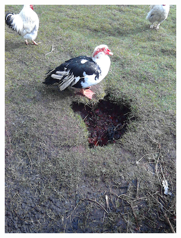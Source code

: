 \documentclass{l4proj}
\begin{document}
\begin{figure}[ht]
\begin{subfigure}[h!]{0.18\textwidth}
    \includegraphics[width=\textwidth, trim={0cm 1.6cm 0cm 1.6cm}, clip]{images/dataset/ugly_duck/rgb.png}

\end{subfigure}
\end{figure}
\end{document}
